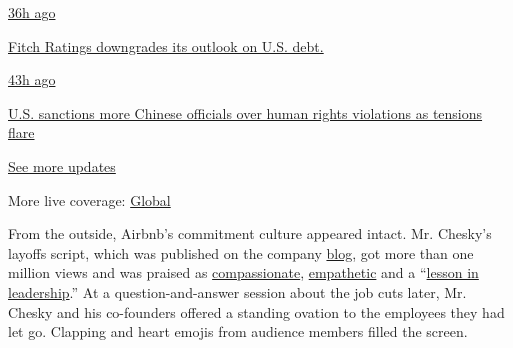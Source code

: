 \href{https://www.nytimes.com/live/2020/07/31/business/stock-market-today-coronavirus?action=click\&pgtype=Article\&state=default\&region=MAIN_CONTENT_1\&context=storylines_live_updates\#fitch-ratings-downgrades-its-outlook-on-us-debt}{36h
ago}

\href{https://www.nytimes.com/live/2020/07/31/business/stock-market-today-coronavirus?action=click\&pgtype=Article\&state=default\&region=MAIN_CONTENT_1\&context=storylines_live_updates\#fitch-ratings-downgrades-its-outlook-on-us-debt}{Fitch
Ratings downgrades its outlook on U.S. debt.}

\href{https://www.nytimes.com/live/2020/07/31/business/stock-market-today-coronavirus?action=click\&pgtype=Article\&state=default\&region=MAIN_CONTENT_1\&context=storylines_live_updates\#us-sanctions-more-chinese-officials-over-human-rights-violations-as-tensions-flare}{43h
ago}

\href{https://www.nytimes.com/live/2020/07/31/business/stock-market-today-coronavirus?action=click\&pgtype=Article\&state=default\&region=MAIN_CONTENT_1\&context=storylines_live_updates\#us-sanctions-more-chinese-officials-over-human-rights-violations-as-tensions-flare}{U.S.
sanctions more Chinese officials over human rights violations as
tensions flare}

\href{https://www.nytimes.com/live/2020/07/31/business/stock-market-today-coronavirus?action=click\&pgtype=Article\&state=default\&region=MAIN_CONTENT_1\&context=storylines_live_updates}{See
more updates}

More live coverage:
\href{https://www.nytimes.com/2020/08/01/world/coronavirus-covid-19.html?action=click\&pgtype=Article\&state=default\&region=MAIN_CONTENT_1\&context=storylines_live_updates}{Global}

From the outside, Airbnb's commitment culture appeared intact. Mr.
Chesky's layoffs script, which was published on the company
\href{https://news.airbnb.com/a-message-from-co-founder-and-ceo-brian-chesky/}{blog},
got more than one million views and was praised as
\href{https://www.businessinsider.com/airbnb-ceo-brian-chesky-layoffs-show-respect-compassion-for-employees-2020-5}{compassionate},
\href{https://www.prnewsonline.com/airbnb-ceo-delivers-empathetic-transparent-message-regarding-layoffs/}{empathetic}
and a
``\href{https://www.inc.com/jason-aten/lessons-behind-airbnb-ceos-email-about-laying-off-1900-workers.html}{lesson
in leadership}.'' At a question-and-answer session about the job cuts
later, Mr. Chesky and his co-founders offered a standing ovation to the
employees they had let go. Clapping and heart emojis from audience
members filled the screen.

